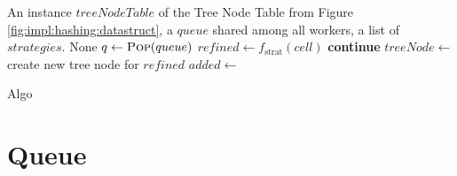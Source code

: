 		\begin{algorithm}[ht!]
			\centering
			\begin{algorithmic}
				\Require An instance $treeNodeTable$ of the Tree Node Table from Figure \ref{fig:impl:hashing:datastruct}, a $queue$ shared among all workers, a list of $strategies$.
				\Ensure None
				\Statex
							\State \Return {}
						\EndIf
						\State $q \gets \Call{Pop}{queue}$
								\State $refined \gets f_{\mathrm{strat}}(cell)$
									\State \textbf{continue}
								\EndIf
								\State $treeNode \gets$ create new tree node for $refined$
								\State $added \gets $ 
								 
									\State {}
								\EndIf
							\EndFor
						\EndFor
					\EndWhile
				\EndFunction
			\end{algorithmic}
			\caption{Algo}
			\label{algo:impl:queue}
		\end{algorithm}

		\clearpage

		\section{Queue}
		\label{chap:impl:threading:queue}

